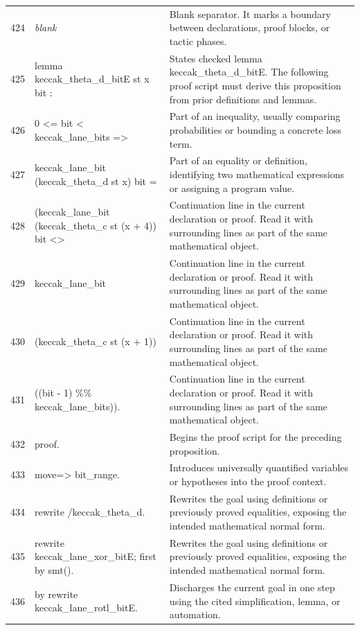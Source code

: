 \documentclass[10pt]{article}
\begin{document}
\begin{longtable}{r L{0.53\textwidth} L{0.37\textwidth}}
424 & {\ttfamily\scriptsize \emph{blank}} & Blank separator.  It marks a boundary between declarations, proof blocks, or tactic phases. \\
425 & {\ttfamily\scriptsize lemma keccak\_theta\_d\_bitE st x bit :} & States checked lemma keccak\_theta\_d\_bitE.  The following proof script must derive this proposition from prior definitions and lemmas. \\
426 & {\ttfamily\scriptsize   0 <= bit < keccak\_lane\_bits =>} & Part of an inequality, usually comparing probabilities or bounding a concrete loss term. \\
427 & {\ttfamily\scriptsize   keccak\_lane\_bit (keccak\_theta\_d st x) bit =} & Part of an equality or definition, identifying two mathematical expressions or assigning a program value. \\
428 & {\ttfamily\scriptsize   (keccak\_lane\_bit (keccak\_theta\_c st (x + 4)) bit <>} & Continuation line in the current declaration or proof.  Read it with surrounding lines as part of the same mathematical object. \\
429 & {\ttfamily\scriptsize    keccak\_lane\_bit} & Continuation line in the current declaration or proof.  Read it with surrounding lines as part of the same mathematical object. \\
430 & {\ttfamily\scriptsize      (keccak\_theta\_c st (x + 1))} & Continuation line in the current declaration or proof.  Read it with surrounding lines as part of the same mathematical object. \\
431 & {\ttfamily\scriptsize      ((bit - 1) \%\% keccak\_lane\_bits)).} & Continuation line in the current declaration or proof.  Read it with surrounding lines as part of the same mathematical object. \\
432 & {\ttfamily\scriptsize proof.} & Begins the proof script for the preceding proposition. \\
433 & {\ttfamily\scriptsize move=> bit\_range.} & Introduces universally quantified variables or hypotheses into the proof context. \\
434 & {\ttfamily\scriptsize rewrite /keccak\_theta\_d.} & Rewrites the goal using definitions or previously proved equalities, exposing the intended mathematical normal form. \\
435 & {\ttfamily\scriptsize rewrite keccak\_lane\_xor\_bitE; first by smt().} & Rewrites the goal using definitions or previously proved equalities, exposing the intended mathematical normal form. \\
436 & {\ttfamily\scriptsize by rewrite keccak\_lane\_rotl\_bitE.} & Discharges the current goal in one step using the cited simplification, lemma, or automation. \\

\end{longtable}
\end{document}
